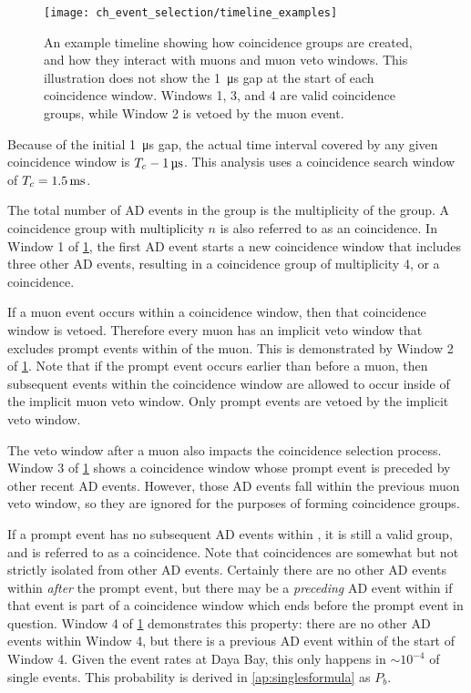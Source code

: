 \begin{figure}
    \texttt{[image: ch\_event\_selection/timeline\_examples]}
    \caption{
        An example timeline showing how coincidence groups are created,
        and how they interact with muons and muon veto windows.
        This illustration does not show the \SI{1}{\micro\second} gap
        at the start of each coincidence window.
        Windows 1, 3, and 4 are valid coincidence groups,
        while Window 2 is vetoed by the muon event.
    }
    \label{fig:timeline_examples}
\end{figure}

Because of the initial \SI{1}{\micro\second} gap,
the actual time interval covered by any given coincidence window is
$T_c - \SI{1}{\micro\second}$.
This analysis uses a coincidence search window of $T_c = \SI{1.5}{\milli\second}$.

The total number of AD events in the group
is the multiplicity of the group.
A coincidence group with multiplicity $n$ is also referred to
as an  coincidence.
In Window 1 of \cref{fig:timeline_examples},
the first AD event starts a new coincidence window
that includes three other AD events,
resulting in a coincidence group of multiplicity 4, or a  coincidence.

If a muon event occurs within a coincidence window,
then that coincidence window is vetoed.
Therefore every muon has an implicit veto window
that excludes prompt events within \tc{} of the muon.
This is demonstrated by Window 2 of \cref{fig:timeline_examples}.
Note that if the prompt event occurs earlier than \tc{} before a muon,
then subsequent events within the coincidence window
are allowed to occur inside of the implicit muon veto window.
Only prompt events are vetoed by the implicit veto window.

The veto window after a muon also impacts the coincidence selection process.
Window 3 of \cref{fig:timeline_examples} shows a coincidence window
whose prompt event is preceded by other recent AD events.
However, those AD events fall within the previous muon veto window,
so they are ignored for the purposes of forming coincidence groups.

If a prompt event has no subsequent AD events within \tc, it is
still a valid group, and is referred to as a  coincidence.
Note that  coincidences are somewhat but not strictly isolated
from other AD events.
Certainly there are no other AD events
within \tc{} \textit{after} the prompt event,
but there may be a \textit{preceding} AD event within \tc{}
if that event is part of a coincidence window
which ends before the prompt event in question.
Window 4 of \cref{fig:timeline_examples} demonstrates this property:
there are no other AD events within Window 4,
but there is a previous AD event within \tc{} of the start of Window 4.
Given the event rates at Daya Bay, this only happens in $\sim10^{-4}$
of single events.
This probability is derived in \cref{ap:singlesformula} as $P_b$.


